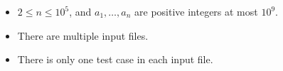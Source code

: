 \begin{itemize}
\tightlist
\item $2\le n\le 10^5$, and $a_1,\ldots,a_n$ are positive integers at most $10^9$.
\item There are multiple input files.
\item There is only one test case in each input file.
\end{itemize}

